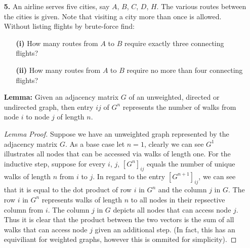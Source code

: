 \documentclass[ 12pt ]{article}
\begin{document}
\begin{enumerate}
\begin{proof}
\begin{enumerate}
					Hence, $$T^{-1} \begin{pmatrix} x_1 \\ x_2 \\ x_3 \end{pmatrix} = \frac{1}{2} \begin{bmatrix} 1 & -1 & 1 \\ 1 & 1 & -1 \\ -1 & 1 & 1 \end{bmatrix} \begin{pmatrix} x_1 \\ x_2 \\ x_3 \end{pmatrix}
					= \frac{1}{2}\begin{pmatrix} x_1 - x_2 + x_3 \\ x_1 + x_2 - x_3 \\ -x_1 + x_2 + x_3 \end{pmatrix}.$$
			\end{enumerate}
		\end{proof}


	\item[\textbf{5.}] An airline serves five cities, say $A$, $B$, $C$, $D$, $H$. The various routes
		between the cities is given. Note that visiting a city more than once is allowed. Without listing flights by brute-force find:
		\begin{enumerate}
			\item[\textbf{(i)}] How many routes from $A$ to $B$ require exactly three connecting flights?
			\item[\textbf{(ii)}] How many routes from $A$ to $B$ require no more than four connecting flights?
		\end{enumerate}

		\textbf{Lemma:} Given an adjacency matrix $G$ of an unweighted, directed or undirected graph, then entry $ij$ of $G^n$ represents the number of walks from node $i$
			to node $j$ of length $n$.

		\begin{proof}[Lemma Proof]
			Suppose we have an unweighted graph represented by the adjacency matrix $G$. As a base case let $n=1$, clearly we can see $G^1$ illustrates all nodes that can
			be accessed via walks of length one. For the inductive step, suppose for every $i$, $j$, $[G^n]_{ij}$ equals the number of unique walks of length $n$ from $i$
			to $j$. In regard to the entry $[G^{n+1}]_{ij}$, we can see that it is equal to the dot product of row $i$ in $G^n$ and the column $j$ in $G$. The row $i$ in
			$G^n$ represents walks of length $n$ to all nodes in their repsective column from $i$. The column $j$ in $G$ depicts all nodes that can access node $j$. Thus
			it is clear that the product between the two vectors is the sum of all walks that can access node $j$ given an additional step. (In fact, this has an equiviliant for weighted graphs, however this is ommited for simplicity).
		\end{proof}


\end{enumerate}
\end{document}
